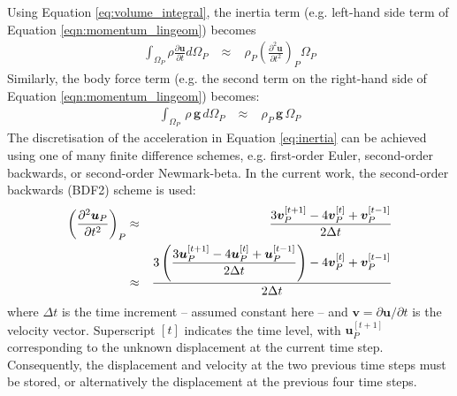 \documentclass[sn-mathphys,Numbered]{sn-jnl}%
\newcommand{\bb}{\boldsymbol}
\begin{document}
Using Equation \ref{eq:volume_integral}, the inertia term (e.g. left-hand side term of Equation \ref{eqn:momentum_lingeom}) becomes
\begin{eqnarray} \label{eq:inertia}
	\int_{\Omega_P} \rho \frac{\partial \bb{u} }{\partial t}  d \Omega_P
	\;&\approx&\;
	\rho_P \left(\frac{\partial^2 \bb{u} }{\partial t^2}\right)_P  \Omega_P
\end{eqnarray}
Similarly, the body force term (e.g. the second term on the right-hand side of Equation \ref{eqn:momentum_lingeom}) becomes:
\begin{eqnarray}
	\int_{\Omega_P} \, \rho \, \bb{g} \,  d \Omega_P
	\;&\approx&\;
	\rho_P \, \bb{g}\,  \Omega_P
\end{eqnarray}
The discretisation of the acceleration in Equation \ref{eq:inertia} can be achieved using one of many finite difference schemes, e.g. first-order Euler, second-order backwards, or second-order Newmark-beta.
In the current work, the second-order backwards (BDF2) scheme is used:
\begin{eqnarray} \label{eq:inertia2}
	\left(\frac{\partial^2 \boldsymbol{u}_P}{\partial t^2}\right)_P
	&\approx& \frac{3\boldsymbol{v}_P^{[t+1]} - 4\boldsymbol{v}_P^{[t]} + \boldsymbol{v}_P^{[t-1]}}{2\Delta t} \notag \\
	&\approx&
	\frac{3\left( 
		\dfrac{3\boldsymbol{u}_P^{[t+1]} - 4\boldsymbol{u}_P^{[t]} + \boldsymbol{u}_P^{[t-1]}}{2\Delta t} 
		\right) 
	- 4\boldsymbol{v}_P^{[t]} + \boldsymbol{v}_P^{[t-1]}}{2\Delta t}
\end{eqnarray}
where $\Delta t$ is the time increment -- assumed constant here -- and $\bb{v} = \partial \bb{u}/\partial t$ is the velocity vector.
Superscript $[t]$ indicates the time level, with $\bb{u}_P^{[t+1]}$ corresponding to the unknown displacement at the current time step.
Consequently, the displacement and velocity at the two previous time steps must be stored, or alternatively the displacement at the previous four time steps.
\end{document}
